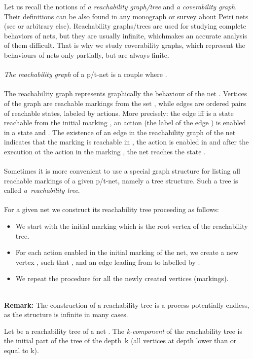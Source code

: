\documentclass[a4paper]{llncs}
\begin{document}
Let us recall the notions of  \emph{a reachability graph/tree} and \emph{a coverability graph}. Their definitions can be also found in any monograph or survey about Petri nets (see \cite{DeselReisig,Starke} or arbitrary else). Reachability graphs/trees are used for studying complete behaviors of nets, but they are usually infinite, whichmakes an accurate analysis of them difficult. That is why we study coverability graphs, which represent the behaviours of nets only partially, but are always finite.
\\ \\
\emph{The reachability graph} of a p/t-net  is a couple  where .
\\ \\
The reachability graph  represents graphically the behaviour of the net . Vertices of the graph are reachable markings from the set , while edges are ordered pairs of reachable states, labeled by actions. More precisely: the edge  iff  is a state reachable from the initial marking , an action  (the label of the edge ) is enabled in a state  and . The existence of an edge  in the reachability graph of the net  indicates that the marking  is reachable in , the action  is enabled in  and after the execution ot the action  in the marking , the net  reaches the state .
\\ \\
Sometimes it is more convenient to use a special graph structure for listing all reachable markings of a given p/t-net, namely a tree structure. Such a tree is called \emph{a~reachability tree}. 
\\ \\For a given net  we construct its reachability tree  proceeding as follows:
\begin{itemize}
\item We start with the initial marking  which is the root vertex of the reachability tree.
\item For each action  enabled in the initial marking of the net, we create a new vertex , such that , and an edge  leading from  to  labelled by . 
\item We repeat the procedure for all the newly created vertices (markings).
\end{itemize}\mbox{ }\\
\textbf{Remark:} The construction of a reachability tree is a process potentially endless, as the structure is infinite in many cases.\\
\begin{definition}
Let  be a reachability tree of a net . The \emph{k-component} of the reachability tree  is the initial part of the tree of the depth~k (all vertices at depth lower than or equal to k).
\end{definition}\mbox{ }\\
\end{document}
